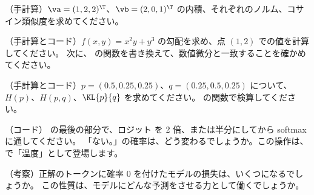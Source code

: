 \begin{exercises}
\item （手計算）$\va=(1,2,2)^\T$、$\vb=(2,0,1)^\T$ の内積、それぞれのノルム、コサイン類似度を求めてください。
\item （手計算とコード）$f(x,y)=x^{2}y+y^{3}$ の勾配を求め、点 $(1,2)$ での値を計算してください。
  次に、 の関数を書き換えて、数値微分と一致することを確かめてください。
\item （手計算とコード）$p=(0.5,0.25,0.25)$、$q=(0.25,0.5,0.25)$ について、$H(p)$、$H(p,q)$、$\KL{p}{q}$ を求めてください。
   の関数で検算してください。
\item （コード） の最後の部分で、ロジット  を 2 倍、または半分にしてから softmax に通してください。
  「ない。」の確率は、どう変わるでしょうか。この操作は、で「温度」として登場します。
\item （考察）正解のトークンに確率 0 を付けたモデルの損失は、いくつになるでしょうか。
  この性質は、モデルにどんな予測をさせる力として働くでしょうか。
\end{exercises}
